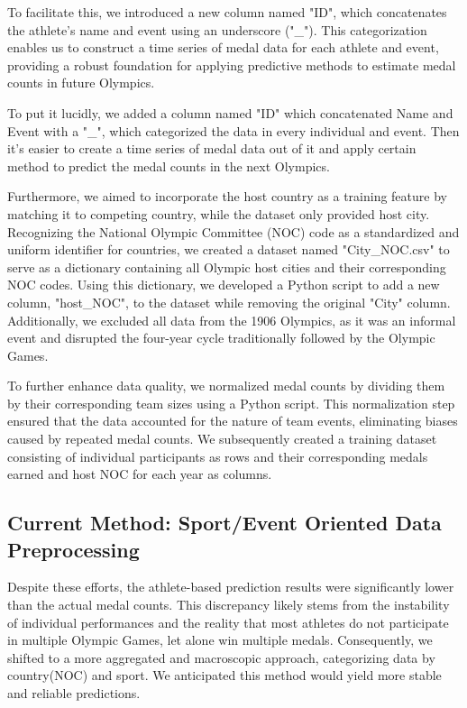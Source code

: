 \documentclass{mcmthesis}
\begin{document}
To facilitate this, we introduced a new column named "ID", which concatenates the athlete's name and event using an underscore ("\_"). This categorization enables us to construct a time series of medal data for each athlete and event, providing a robust foundation for applying predictive methods to estimate medal counts in future Olympics.

To put it lucidly, we added a column named "ID" which concatenated Name and Event with a "\_", which categorized the data in every individual and event. Then it's easier to create a time series of medal data out of it and apply certain method to predict the medal counts in the next Olympics.

Furthermore, we aimed to incorporate the host country as a training feature by matching it to competing country, while the dataset only provided host city. Recognizing the National Olympic Committee (NOC) code as a standardized and uniform identifier for countries, we created a dataset named "City\_NOC.csv" to serve as a dictionary containing all Olympic host cities and their corresponding NOC codes. Using this dictionary, we developed a Python script to add a new column, "host\_NOC", to the dataset while removing the original "City" column. Additionally, we excluded all data from the 1906 Olympics, as it was an informal event and disrupted the four-year cycle traditionally followed by the Olympic Games.

To further enhance data quality, we normalized medal counts by dividing them by their corresponding team sizes using a Python script. This normalization step ensured that the data accounted for the nature of team events, eliminating biases caused by repeated medal counts. We subsequently created a training dataset consisting of individual participants as rows and their corresponding medals earned and host NOC for each year as columns.

\subsection{Current Method: Sport/Event Oriented Data Preprocessing}

Despite these efforts, the athlete-based prediction results were significantly lower than the actual medal counts. This discrepancy likely stems from the instability of individual performances and the reality that most athletes do not participate in multiple Olympic Games, let alone win multiple medals. Consequently, we shifted to a more aggregated and macroscopic approach, categorizing data by country(NOC) and sport. We anticipated this method would yield more stable and reliable predictions.
\end{document}
